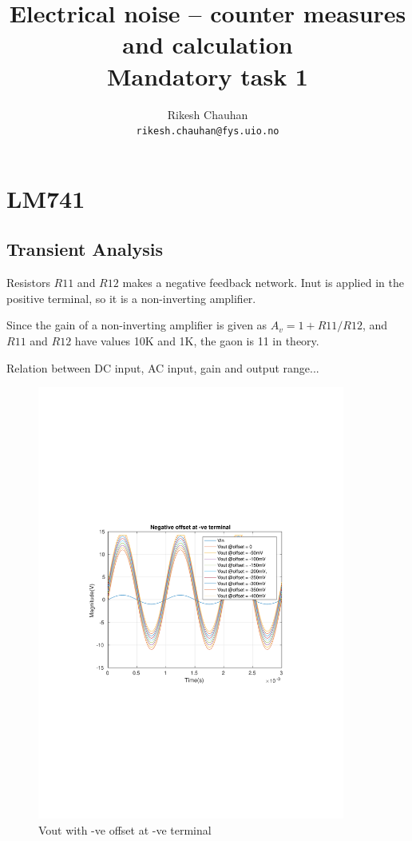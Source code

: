\documentclass[12pt,a4paper,UKenglish]{article}
\title{Electrical noise – counter measures and calculation\\
Mandatory task 1}
\author{Rikesh Chauhan\\ 
\texttt{rikesh.chauhan@fys.uio.no}}
\date{}
\begin{document}
\maketitle

\section{LM741}
\subsection{Transient Analysis}
Resistors $R11$ and $R12$ makes a negative feedback network. Inut is applied in the positive terminal, so it is a non-inverting amplifier. 

Since the gain of a non-inverting amplifier is given as $A_v = 1 + R11/R12$, and  $R11$ and $R12$ have values 10K and 1K, the gaon is 11 in theory.

Relation between DC input, AC input, gain and output range...

\begin{figure} [h]
  \centering 
  \includegraphics[width=0.9\textwidth]{img/1a_offset_neg.pdf} 
  \caption{Vout with -ve offset at -ve terminal}
  \label{neg_offset} 
\end{figure}
\end{document}
